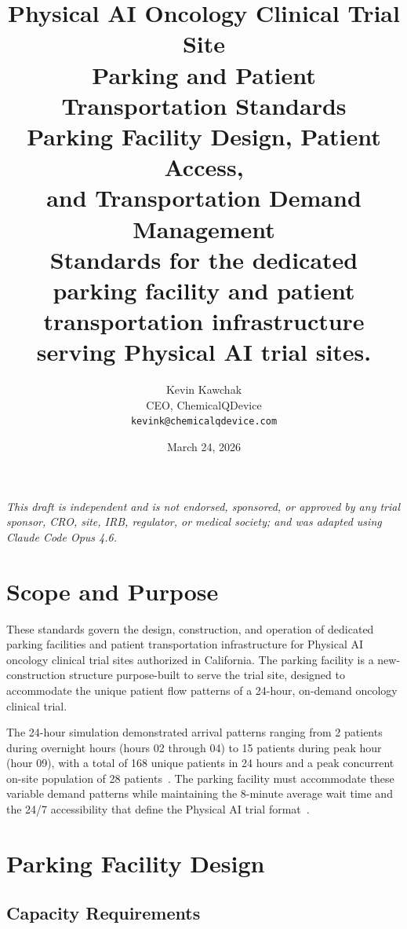 \documentclass[11pt,letterpaper]{article}
\title{%
  \textbf{Physical AI Oncology Clinical Trial Site}\\
  \textbf{Parking and Patient Transportation Standards}\\[6pt]
  \large Parking Facility Design, Patient Access,\\
  and Transportation Demand Management\\[6pt]
  \normalsize Standards for the dedicated parking facility and patient\\
  transportation infrastructure serving Physical AI trial sites.
}
\author{%
  Kevin Kawchak\\
  CEO, ChemicalQDevice\\
  \texttt{kevink@chemicalqdevice.com}
}
\date{March 24, 2026}
\begin{document}
\maketitle
\thispagestyle{fancy}

\begin{center}
\footnotesize
\textit{This draft is independent and is not endorsed, sponsored, or approved
by any trial sponsor, CRO, site, IRB, regulator, or medical society;
and was adapted using Claude Code Opus 4.6.}
\end{center}

\vspace{1em}
\tableofcontents
\newpage

\section{Scope and Purpose}

These standards govern the design, construction, and operation of dedicated
parking facilities and patient transportation infrastructure for Physical AI
oncology clinical trial sites authorized in California. The parking facility
is a new-construction structure purpose-built to serve the trial site, designed
to accommodate the unique patient flow patterns of a 24-hour, on-demand
oncology clinical trial.

The 24-hour simulation demonstrated arrival patterns ranging from 2 patients
during overnight hours (hours 02 through 04) to 15 patients during peak hour
(hour 09), with a total of 168 unique patients in 24 hours and a peak
concurrent on-site population of 28 patients~\cite{newtrial2026}. The parking
facility must accommodate these variable demand patterns while maintaining the
8-minute average wait time and the 24/7 accessibility that define the Physical
AI trial format~\cite{formatcomparison2026}.

\section{Parking Facility Design}

\subsection{Capacity Requirements}
\end{document}
